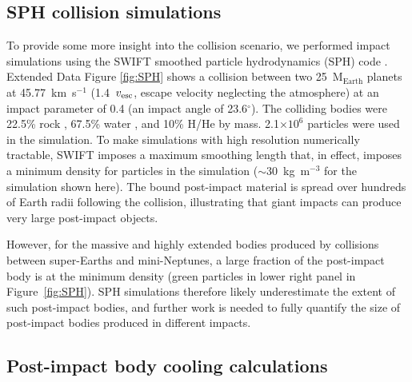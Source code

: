 \documentclass[sn-nature,oneside]{sn-jnl}%
\begin{document}
\subsection*{SPH collision simulations}

To provide some more insight into the collision scenario, we performed impact simulations using the SWIFT smoothed particle hydrodynamics (SPH) code \cite{Schaller2016,Schaller2018,Kegerreis2019}.
%
Extended Data Figure \ref{fig:SPH} shows a collision between two 25~$\mathrm{M_{Earth}}$ planets at 45.77~km~s$^{-1}$ (1.4~$v_{\rm esc}$, escape velocity neglecting the atmosphere) at an impact parameter of 0.4 (an impact angle of 23.6$^\circ$).
%
The colliding bodies were 22.5\% rock \cite[forsterite,][]{Stewart2019forsteriteEOS,Stewart2020_key_req_EOS}, 67.5\% water \cite{Senft2008}, and 10\% H/He \cite{Hubbard1980} by mass.
%
2.1$\times10^6$ particles were used in the simulation.
%
To make simulations with high resolution numerically tractable, SWIFT imposes a maximum smoothing length that, in effect, imposes a minimum density for particles in the simulation ($\sim30$~kg~m$^{-3}$ for the simulation shown here). 
%
The bound post-impact material is spread over hundreds of Earth radii following the collision, illustrating that giant impacts can produce very large post-impact objects. 

However, for the massive and highly extended bodies produced by collisions between super-Earths and mini-Neptunes, a large fraction of the post-impact body is at the minimum density (green particles in lower right panel in Figure~\ref{fig:SPH}).
%
SPH simulations therefore likely underestimate the extent of such post-impact bodies, and further work is needed to fully quantify the size of post-impact bodies produced in different impacts.

\subsection*{Post-impact body cooling calculations}
\end{document}
